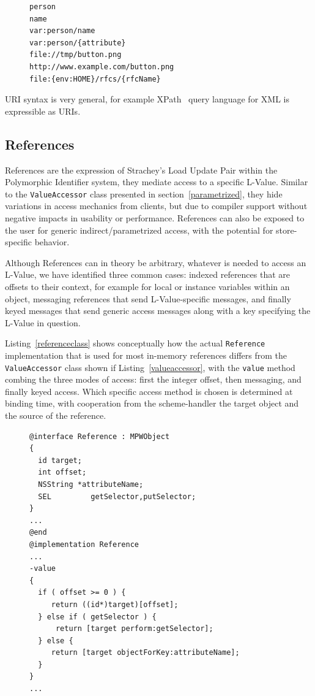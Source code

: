 \documentclass[preprint]{sigplanconf}
\begin{document}
\begin{figure}[htbp]
\begin{lstlisting}[style=numbers,label=validpis,caption=Valid Polymorphic Identifiers]
person
name
var:person/name
var:person/{attribute}
file://tmp/button.png
http://www.example.com/button.png
file:{env:HOME}/rfcs/{rfcName} 
\end{lstlisting}
\end{figure}

URI syntax is very general, for example XPath~\cite{path} query language for XML is 
expressible as URIs.

\subsection{References}

References are the expression of Strachey's Load Update Pair within the Polymorphic
Identifier system, they mediate access to a specific L-Value.  Similar to the {\tt ValueAccessor}
class presented in section~\ref{parametrized}, they hide variations in access mechanics from
clients, but due to compiler support without negative impacts in usability or performance. 
References can also be exposed to the user for generic indirect/parametrized access, with
the potential for store-specific behavior.

Although References can in theory be arbitrary, whatever is needed to access an L-Value,
we have identified three common cases:   indexed references that are offsets to their
context, for example for local or instance variables within an object, messaging references
that send L-Value-specific messages, and finally keyed messages that send generic
access messages along with a key specifying the L-Value in question.

Listing~\ref{referenceclass} shows conceptually how the actual {\tt Reference} implementation
that is used for most in-memory references 
differs from the {\tt ValueAccessor} class shown if Listing~\ref{valueaccessor}, with the
{\tt value} method combing the three modes of access:  first the integer offset, then messaging, and
finally keyed access.  Which specific access method is chosen is determined at binding time,
with cooperation from the scheme-handler the target object and the source of the reference.


\begin{figure}[htbp]
\begin{lstlisting}[style=numbers,label=referenceclass,caption=Reference class extract]
@interface Reference : MPWObject
{
  id target;
  int offset;
  NSString *attributeName;
  SEL         getSelector,putSelector;
}
...
@end
@implementation Reference
...
-value
{
  if ( offset >= 0 ) {
     return ((id*)target)[offset];
  } else if ( getSelector ) {
      return [target perform:getSelector];
  } else {
     return [target objectForKey:attributeName];
  }
}
...
\end{lstlisting}
\end{figure}
\end{document}
